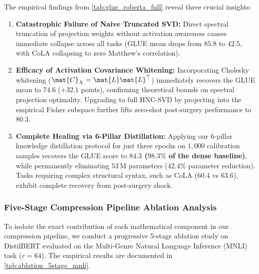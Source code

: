 The empirical findings from \cref{tab:glue_roberta_full} reveal three crucial insights:
\begin{enumerate}
    \item \textbf{Catastrophic Failure of Naive Truncated SVD:} Direct spectral truncation of projection weights without activation awareness causes immediate collapse across all tasks (GLUE mean drops from $85.8$ to $42.5$, with CoLA collapsing to zero Matthew's correlation).
    \item \textbf{Efficacy of Activation Covariance Whitening:} Incorporating Cholesky whitening ($\mat{C}_X = \mat{L}\mat{L}^\top$) immediately recovers the GLUE mean to $74.6$ ($+32.1$ points), confirming theoretical bounds on spectral projection optimality. Upgrading to full HNC-SVD by projecting into the empirical Fisher subspace further lifts zero-shot post-surgery performance to $80.3$.
    \item \textbf{Complete Healing via 6-Pillar Distillation:} Applying our 6-pillar knowledge distillation protocol for just three epochs on $1{,}000$ calibration samples recovers the GLUE score to \textbf{$84.3$ ($98.3\%$ of the dense baseline)}, while permanently eliminating $53\,\text{M}$ parameters ($42.4\%$ parameter reduction). Tasks requiring complex structural syntax, such as CoLA ($60.4$ vs $63.6$), exhibit complete recovery from post-surgery shock.
\end{enumerate}

\subsubsection{Five-Stage Compression Pipeline Ablation Analysis}
\label{sec:results_ablation_pipeline}

To isolate the exact contribution of each mathematical component in our compression pipeline, we conduct a progressive 5-stage ablation study on DistilBERT evaluated on the Multi-Genre Natural Language Inference (MNLI) task ($r=64$). The empirical results are documented in \cref{tab:ablation_5stage_mnli}.

